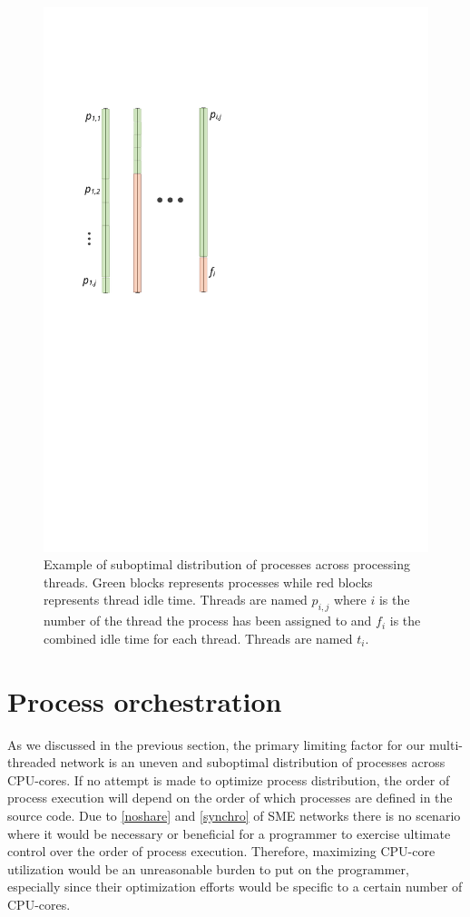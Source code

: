 \begin{figure}
\centering
\includegraphics{figures/parallel}
\caption[Proposed SME parallelization model]{Example of suboptimal
  distribution of processes across processing threads. Green blocks
  represents processes while red blocks represents thread idle
  time. Threads are named $p_{i,j}$ where $i$ is the number of the
  thread the process has been assigned to and $f_i$ is the combined
  idle time for each thread. Threads are named $t_i$.}

\label{fig:suboptdist}

\end{figure}

\section{Process orchestration}
As we discussed in the previous section, the primary limiting factor
for our multi-threaded network is an uneven and suboptimal
distribution of processes across CPU-cores. If no attempt is made to
optimize process distribution, the order of process execution will
depend on the order of which processes are defined in the source
code. Due to \cref{noshare} and \cref{synchro} of SME
networks there is no scenario where it would be necessary or
beneficial for a programmer to exercise ultimate control over the
order of process execution. Therefore, maximizing CPU-core utilization
would be an unreasonable burden to put on the programmer, especially
since their optimization efforts would be specific to a certain number
of CPU-cores.

